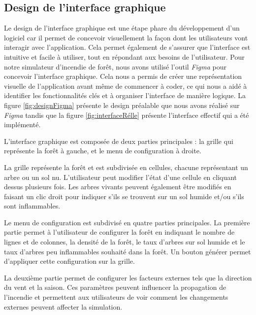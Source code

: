 \subsection{Design de l’interface graphique}

Le design de l'interface graphique est une étape phare du développement d'un logiciel car il permet de concevoir visuellement la façon dont les utilisateurs vont interagir avec l'application. Cela permet également de s'assurer que l'interface est intuitive et facile à utiliser, tout en répondant aux besoins de l'utilisateur. Pour notre simulateur d'incendie de forêt, nous avons utilisé l'outil \textit{Figma} pour concevoir l'interface graphique. Cela nous a permis de créer une représentation visuelle de l'application avant même de commencer à coder, ce qui nous a aidé à identifier les fonctionnalités clés et à organiser l'interface de manière logique. La figure \ref{fig:designFigma} présente le design préalable que nous avons réalisé sur \textit{Figma} tandis que la figure \ref{fig:interfaceRélle} présente l’interface effectif qui a été implémenté.


L'interface graphique est composée de deux parties principales : la grille qui représente la forêt à gauche, et le menu de configuration à droite.

La grille représente la forêt et est subdivisée en cellules, chacune représentant un arbre ou un sol nu. L'utilisateur peut modifier l'état d'une cellule en cliquant dessus plusieurs fois. Les arbres vivants peuvent également être modifiés en faisant un clic droit pour indiquer s'ils se trouvent sur un sol humide et/ou s'ils sont inflammables.

Le menu de configuration est subdivisé en quatre parties principales. La première partie permet à l'utilisateur de configurer la forêt en indiquant le nombre de lignes et de colonnes, la densité de la forêt, le taux d'arbres sur sol humide et le taux d'arbres peu inflammables souhaité dans la forêt. Un bouton générer permet d'appliquer cette configuration sur la grille.

La deuxième partie permet de configurer les facteurs externes tels que la direction du vent et la saison. Ces paramètres peuvent influencer la propagation de l'incendie et permettent aux utilisateurs de voir comment les changements externes peuvent affecter la simulation.

